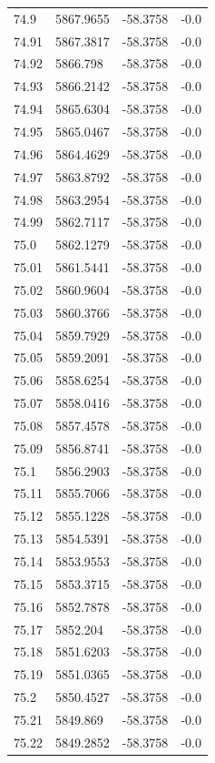 \begin{table}[H]
\begin{tabular}{llll}
74.9 & 5867.9655 & -58.3758 & -0.0 \\
74.91 & 5867.3817 & -58.3758 & -0.0 \\
74.92 & 5866.798 & -58.3758 & -0.0 \\
74.93 & 5866.2142 & -58.3758 & -0.0 \\
74.94 & 5865.6304 & -58.3758 & -0.0 \\
74.95 & 5865.0467 & -58.3758 & -0.0 \\
74.96 & 5864.4629 & -58.3758 & -0.0 \\
74.97 & 5863.8792 & -58.3758 & -0.0 \\
74.98 & 5863.2954 & -58.3758 & -0.0 \\
74.99 & 5862.7117 & -58.3758 & -0.0 \\
75.0 & 5862.1279 & -58.3758 & -0.0 \\
75.01 & 5861.5441 & -58.3758 & -0.0 \\
75.02 & 5860.9604 & -58.3758 & -0.0 \\
75.03 & 5860.3766 & -58.3758 & -0.0 \\
75.04 & 5859.7929 & -58.3758 & -0.0 \\
75.05 & 5859.2091 & -58.3758 & -0.0 \\
75.06 & 5858.6254 & -58.3758 & -0.0 \\
75.07 & 5858.0416 & -58.3758 & -0.0 \\
75.08 & 5857.4578 & -58.3758 & -0.0 \\
75.09 & 5856.8741 & -58.3758 & -0.0 \\
75.1 & 5856.2903 & -58.3758 & -0.0 \\
75.11 & 5855.7066 & -58.3758 & -0.0 \\
75.12 & 5855.1228 & -58.3758 & -0.0 \\
75.13 & 5854.5391 & -58.3758 & -0.0 \\
75.14 & 5853.9553 & -58.3758 & -0.0 \\
75.15 & 5853.3715 & -58.3758 & -0.0 \\
75.16 & 5852.7878 & -58.3758 & -0.0 \\
75.17 & 5852.204 & -58.3758 & -0.0 \\
75.18 & 5851.6203 & -58.3758 & -0.0 \\
75.19 & 5851.0365 & -58.3758 & -0.0 \\
75.2 & 5850.4527 & -58.3758 & -0.0 \\
75.21 & 5849.869 & -58.3758 & -0.0 \\
75.22 & 5849.2852 & -58.3758 & -0.0 \\

\end{tabular}
\end{table}
